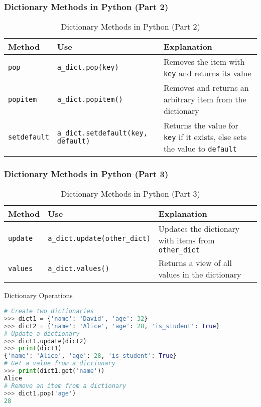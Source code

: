 \begin{frame}
\frametitle{Dictionary Methods in Python (Part 2)}
\begin{table}[]
    \centering
    \begin{tabular}{|l|p{4.3cm}|p{4cm}|}
        \hline
        \textbf{Method} & \textbf{Use} & \textbf{Explanation} \\ \hline
        \texttt{pop} & \texttt{a\_dict.pop(key)} & Removes the item with \texttt{key} and returns its value \\ \hline
        \texttt{popitem} & \texttt{a\_dict.popitem()} & Removes and returns an arbitrary item from the dictionary \\ \hline
        \texttt{setdefault} & \texttt{a\_dict.setdefault(key, default)} & Returns the value for \texttt{key} if it exists, else sets the value to \texttt{default} \\ \hline
    \end{tabular}
    \caption{Dictionary Methods in Python (Part 2)}
\end{table}
\end{frame}


\begin{frame}
\frametitle{Dictionary Methods in Python (Part 3)}
\begin{table}[]
    \centering
    \begin{tabular}{|l|p{5cm}|p{4cm}|}
        \hline
        \textbf{Method} & \textbf{Use} & \textbf{Explanation} \\ \hline
        \texttt{update} & \texttt{a\_dict.update(other\_dict)} & Updates the dictionary with items from \texttt{other\_dict} \\ \hline
        \texttt{values} & \texttt{a\_dict.values()} & Returns a view of all values in the dictionary \\ \hline
    \end{tabular}
    \caption{Dictionary Methods in Python (Part 3)}
\end{table}
\end{frame}

\begin{frame}[fragile]{Dictionary Operations}
    \begin{lstlisting}[style=colorful, language=Python]
# Create two dictionaries
>>> dict1 = {'name': 'David', 'age': 32}
>>> dict2 = {'name': 'Alice', 'age': 28, 'is_student': True}
# Update a dictionary
>>> dict1.update(dict2)
>>> print(dict1)
{'name': 'Alice', 'age': 28, 'is_student': True}
# Get a value from a dictionary
>>> print(dict1.get('name'))
Alice
# Remove an item from a dictionary
>>> dict1.pop('age')
28
    \end{lstlisting}
\end{frame}

